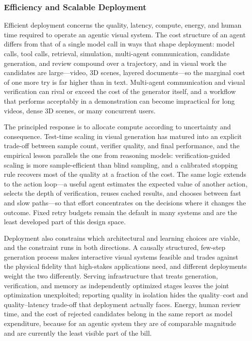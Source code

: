 \subsubsection{Efficiency and Scalable Deployment}

Efficient deployment concerns the quality, latency, compute, energy, and human time required to operate an agentic visual system. The cost structure of an agent differs from that of a single model call in ways that shape deployment: model calls, tool calls, retrieval, simulation, multi-agent communication, candidate generation, and review compound over a trajectory, and in visual work the candidates are large---video, 3D scenes, layered documents---so the marginal cost of one more try is far higher than in text. Multi-agent communication and visual verification can rival or exceed the cost of the generator itself, and a workflow that performs acceptably in a demonstration can become impractical for long videos, dense 3D scenes, or many concurrent users.

The principled response is to allocate compute according to uncertainty and consequence. Test-time scaling in visual generation has matured into an explicit trade-off between sample count, verifier quality, and final performance, and the empirical lesson parallels the one from reasoning models: verification-guided scaling is more sample-efficient than blind sampling, and a calibrated stopping rule recovers most of the quality at a fraction of the cost. The same logic extends to the action loop---a useful agent estimates the expected value of another action, selects the depth of verification, reuses cached results, and chooses between fast and slow paths---so that effort concentrates on the decisions where it changes the outcome. Fixed retry budgets remain the default in many systems and are the least developed part of this design space.

Deployment also constrains which architectural and learning choices are viable, and the constraint runs in both directions. A causally structured, few-step generation process makes interactive visual systems feasible and trades against the physical fidelity that high-stakes applications need, and different deployments weight the two differently. Serving infrastructure that treats generation, verification, and memory as independently optimized stages leaves the joint optimization unexploited; reporting quality in isolation hides the quality--cost and quality--latency trade-off that deployment actually faces. Energy, human review time, and the cost of rejected candidates belong in the same report as model expenditure, because for an agentic system they are of comparable magnitude and are currently the least visible part of the bill.

